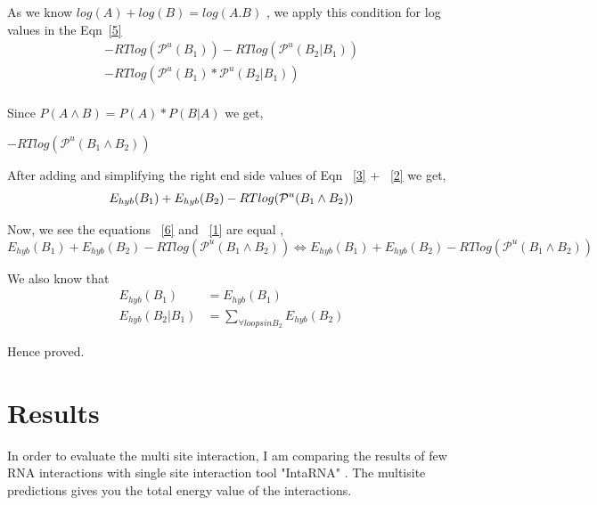 \documentclass[twoside,a4paper]{report}
\begin{document}
	As we know $log (A) + log (B) = log( A . B)$ , we apply this condition for log values in the Eqn~\ref{5}\\
	
	\begin{align*}
		-RTlog(\mathcal{P}^u(B_1)) - RTlog(\mathcal{P}^u(B_2 | B_1))\\
		-RTlog(\mathcal{P}^u(B_1) * \mathcal{P}^u(B_2 | B_1))\\
	\end{align*}
	
	Since $P(A \land B) = P(A) * P(B |A)$ we get,\\
	
	\begin{center}
		$-RTlog(\mathcal{P}^u(B_1 \land B_2))$
	\end{center}

 	After adding and simplifying the right end side values of Eqn ~\ref{3} + ~\ref{2} we get, \\
 	
 	\begin{equation}
 	\label{6}
 	E_{hyb}(B_1) + E_{hyb}(B_2) - RTlog(\mathcal{P}^u(B_1 \land B_2))\\
 	\end{equation}
	
	Now,  we see the equations ~\ref{6} and ~\ref{1} are equal ,\\
	\begin{equation}
	\label{7}
	E_{hyb}(B_1)+E_{hyb}(B_2)-RTlog(\mathcal{P}^u(B_1 \land B_2)) \Leftrightarrow E_{hyb}(B_1) + E_{hyb}(B_2) - RTlog(\mathcal{P}^u(B_1 \land B_2))
	\end{equation}
	
	We also know that \\
	\begin{align*}
		E_{hyb}(B_1) &= E_{hyb}(B_1)\\
		E_{hyb}( B_2 | B_1 ) &= \sum_{\forall loops in B_2}E_{hyb}(B_2)
	\end{align*}
	
	Hence proved. \\
	
	
	\chapter{Results}
	
	In order to evaluate the multi site interaction, I am comparing the results of few RNA interactions with single site interaction tool "IntaRNA" . The multisite predictions gives you the total energy value of the interactions.\\ 
	
\end{document}
